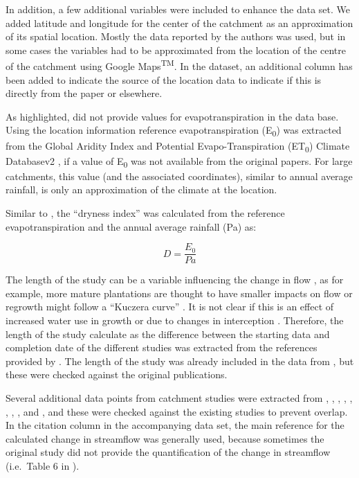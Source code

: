 \documentclass[]{elsarticle} %
\begin{document}
In addition, a few additional variables were included to enhance the data set. We added latitude and longitude for the center of the catchment as an approximation of its spatial location. Mostly the data reported by the authors was used, but in some cases the variables had to be approximated from the location of the centre of the catchment using Google Maps\textsuperscript{TM}. In the dataset, an additional column has been added to indicate the source of the location data to indicate if this is directly from the paper or elsewhere.

As highlighted, \citet{zhang2015} did not provide values for evapotranspiration in the data base. Using the location information reference evapotranspiration (E\textsubscript{0}) was extracted from the Global Aridity Index and Potential Evapo-Transpiration (ET\textsubscript{0}) Climate Databasev2 \citep{trabucco2018}, if a value of E\textsubscript{0} was not available from the original papers. For large catchments, this value (and the associated coordinates), similar to annual average rainfall, is only an approximation of the climate at the location.

Similar to \citet{zhang2017}, the ``dryness index'' was calculated from the reference evapotranspiration and the annual average rainfall (Pa) as:

\begin{equation}
D = \frac{E_{0}}{Pa} \label{eq:eq1}
\end{equation}

The length of the study can be a variable influencing the change in flow \citep[e.g.][]{jackson2005, filoso2017}, as for example, more mature plantations are thought to have smaller impacts on flow or regrowth might follow a ``Kuczera curve'' \citep{kuczera1987}. It is not clear if this is an effect of increased water use in growth \citep{vertessy2001} or due to changes in interception \citep{stoof2012}. Therefore, the length of the study calculate as the difference between the starting data and completion date of the different studies was extracted from the references provided by \citet{zhang2017}. The length of the study was already included in the data from \citet{filoso2017}, but these were checked against the original publications.

Several additional data points from catchment studies were extracted from \citet{almeida2016}, \citet{ferreto2020}, \citet{zhang2011}, \citet{zhao2010}, \citet{borg1988}, \citet{thornton2007}, \citet{zhou2010}, \citet{rodriguez2010}, \citet{ruprechtetal1991} and \citet{pena-arancibia2012}, and these were checked against the existing studies to prevent overlap. In the citation column in the accompanying data set, the main reference for the calculated change in streamflow was generally used, because sometimes the original study did not provide the quantification of the change in streamflow (i.e.~Table 6 in \citet{zhang2011}).
\end{document}
